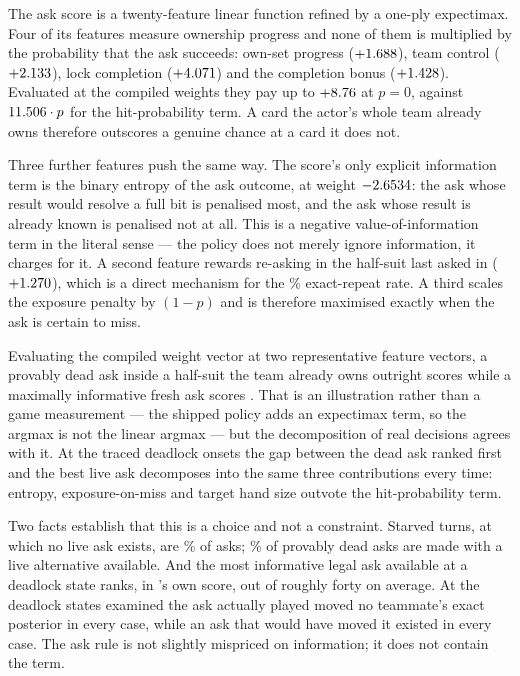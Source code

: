 The ask score is a twenty-feature linear function refined by a one-ply
expectimax. Four of its features measure ownership progress and none of them is
multiplied by the probability that the ask succeeds: own-set progress
($+1.688$), team control ($+2.133$), lock completion
($+4.071$) and the completion bonus ($+1.428$).
Evaluated at the compiled weights they pay up to $+8.76$ at $p = 0$,
against $11.506 \cdot p$ for the hit-probability term. A card the actor's whole team already owns
therefore outscores a genuine chance at a card it does not.

Three further features push the same way. The score's only explicit information
term is the binary entropy of the ask outcome, at weight $-2.6534$: the
ask whose result would resolve a full bit is penalised most, and the ask whose
result is already known is penalised not at all. This is a negative
value-of-information term in the literal sense --- the policy does not merely
ignore information, it charges for it. A second feature rewards re-asking in the
half-suit last asked in ($+1.270$), which is a direct mechanism for the
\numRepeatAsk\% exact-repeat rate. A third scales the exposure penalty by $(1-p)$
and is therefore maximised exactly when the ask is certain to miss.

Evaluating the compiled weight vector at two representative feature vectors, a
provably dead ask inside a half-suit the team already owns outright scores
\numDeadScore{} while a maximally informative fresh ask scores \numLiveScore{}.
That is an illustration rather than a game measurement --- the shipped policy
adds an expectimax term, so the argmax is not the linear argmax --- but the
decomposition of real decisions agrees with it. At the traced deadlock onsets the
gap between the dead ask ranked first and the best live ask decomposes into the
same three contributions every time: entropy, exposure-on-miss and target hand
size outvote the hit-probability term.

Two facts establish that this is a choice and not a constraint. Starved turns,
at which no live ask exists, are \numStarved\% of asks; \numVoluntaryDead\% of
provably dead asks are made with a live alternative available. And the most
informative legal ask available at a deadlock state ranks, in \vfour{}'s own
score, \numInfoRank{} out of roughly forty on average. At the \numInfoFreeStates{}
deadlock states examined the ask actually played moved no teammate's exact
posterior in every case, while an ask that would have moved it existed in every
case. The ask rule is not slightly mispriced on information; it does not contain
the term.

